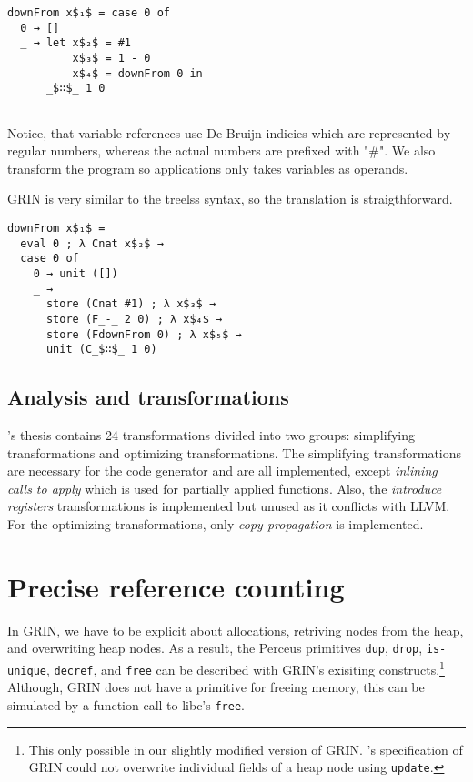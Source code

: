 \documentclass[10pt, twocolumn]{article}
\begin{document}
\begin{lstlisting}[language=treeless]
downFrom x$₁$ = case 0 of
  0 → []
  _ → let x$₂$ = #1
          x$₃$ = 1 - 0
          x$₄$ = downFrom 0 in 
      _$∷$_ 1 0
          
\end{lstlisting}
Notice, that variable references use De Bruijn indicies which are represented by regular numbers, whereas the 
actual numbers are prefixed with "\#".
We also transform the program so applications only takes variables as operands.

% 

GRIN is very similar to the treelss syntax, so the translation is straigthforward.

\begin{lstlisting}[mathescape=true]
downFrom x$₁$ =
  eval 0 ; λ Cnat x$₂$ →
  case 0 of
    0 → unit ([])
    _ →
      store (Cnat #1) ; λ x$₃$ →
      store (F_-_ 2 0) ; λ x$₄$ →
      store (FdownFrom 0) ; λ x$₅$ →
      unit (C_$∷$_ 1 0)
\end{lstlisting}



\subsection{Analysis and transformations}
\citeauthor{boquist1999}'s thesis contains 24 transformations divided into two groups: simplifying transformations and optimizing 
transformations. 
The simplifying transformations are necessary for the code generator and are all implemented, except \emph{inlining calls to apply}
which is used for partially applied functions. 
Also, the \emph{introduce registers} transformations is implemented but unused as it conflicts with LLVM.
For the optimizing transformations, only \emph{copy propagation} is implemented.


\section{Precise reference counting}

In GRIN, we have to be explicit about allocations, retriving nodes from the heap, and overwriting heap nodes.
As a result, the Perceus primitives \texttt{dup}, \texttt{drop}, \texttt{is-unique}, \texttt{decref}, and \texttt{free} 
can be described with GRIN's exisiting constructs.\footnote{This only possible in our slightly modified version of 
GRIN. \citeauthor{boquist1999}'s specification of GRIN could not overwrite individual fields of a heap node 
using \texttt{update}.}
Although, GRIN does not have a primitive for freeing memory, this can be simulated by a function call 
to libc's \texttt{free}.
 
\end{document}
